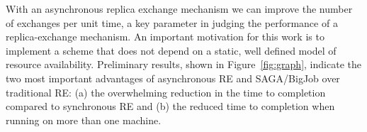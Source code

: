 \documentclass[a4paper,10pt]{article}
\newcommand{\athotanote}[1]{ {\textcolor{green} { ***athota: #1 }}}
\newcommand{\athotanote}[1]{}
\begin{document}




With an asynchronous replica exchange mechanism we can improve the
number of exchanges per unit time, a key parameter in judging the
performance of a replica-exchange mechanism.  An important motivation
for this work is to implement a scheme that does not depend on a
static, well defined model of resource availability. %
Preliminary results, shown in Figure~\ref{fig:graph}, indicate the two most important advantages of asynchronous RE and SAGA/BigJob over traditional RE: (a) the overwhelming reduction in the time to completion compared to synchronous RE and (b) the reduced time to completion when running on more than one machine.
\end{document}
